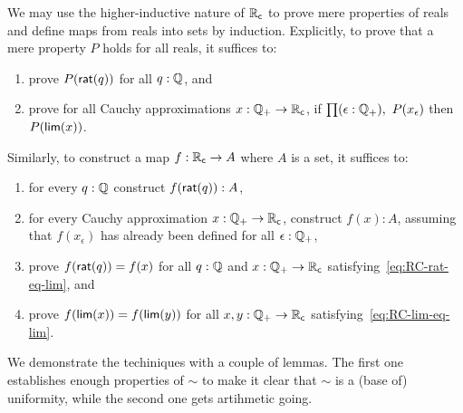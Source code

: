 We may use the higher-inductive nature of $\mathbb{R}_\mathsf{c}$ to prove mere properties of reals and
define maps from reals into sets by induction. Explicitly, to prove that a mere property
$P$ holds for all reals, it suffices to:
%
\begin{enumerate}
\item prove $P(\mathsf{rat}(q))$ for all $q : \mathbb{Q}$, and
\item prove for all Cauchy approximations $x : \mathbb{Q}_{+} \to \mathbb{R}_\mathsf{c}$, if $\prd{\epsilon : \Qp}
  P(x_\epsilon)$ then $P(\mathsf{lim}(x))$.
\end{enumerate}
%
Similarly, to construct a map $f : \mathbb{R}_\mathsf{c} \to A$ where $A$ is a set, it suffices to:
%
\begin{enumerate}
\item for every $q : \mathbb{Q}$ construct $f(\mathsf{rat}(q)) : A$,
\item for every Cauchy approximation $x : \mathbb{Q}_{+} \to \mathbb{R}_\mathsf{c}$, construct $f(x) : A$,
  assuming that $f(x_\epsilon)$ has already been defined for all $\epsilon : \mathbb{Q}_{+}$,
\item prove $f(\mathsf{rat}(q)) = f(x)$ for all $q : \mathbb{Q}$ and $x : \mathbb{Q}_{+} \to \mathbb{R}_\mathsf{c}$
  satisfying~\eqref{eq:RC-rat-eq-lim}, and
\item prove $f(\mathsf{lim}(x)) = f(\mathsf{lim}(y))$ for all $x, y : \mathbb{Q}_{+} \to \mathbb{R}_\mathsf{c}$
  satisfying~\eqref{eq:RC-lim-eq-lim}.
\end{enumerate}
%
We demonstrate the techiniques with a couple of lemmas. The first one establishes enough
properties of $\sim$ to make it clear that $\sim$ is a (base of) uniformity, while the
second one gets artihmetic going.

